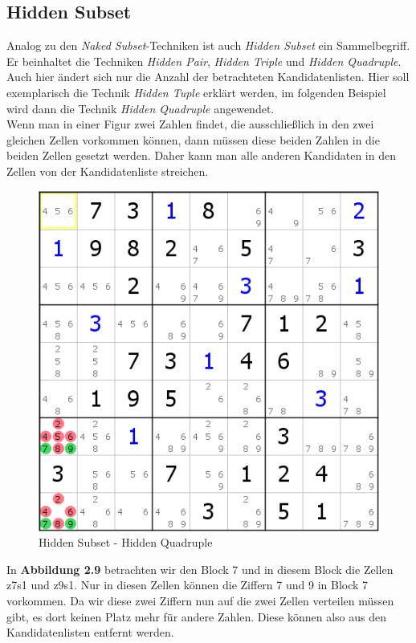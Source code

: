 \newpage
\subsection{Hidden Subset}
\label{Hidden Subset}
Analog zu den \textit{Naked Subset}-Techniken ist auch \textit{Hidden Subset} ein Sammelbegriff. Er beinhaltet die Techniken \textit{Hidden Pair}, \textit{Hidden Triple} und \textit{Hidden Quadruple}. Auch hier ändert sich nur die Anzahl der betrachteten Kandidatenlisten. Hier soll exemplarisch die Technik \textit{Hidden Tuple} erklärt werden, im folgenden Beispiel wird dann die Technik \textit{Hidden Quadruple} angewendet.\\
Wenn man in einer Figur zwei Zahlen findet, die ausschließlich in den zwei gleichen Zellen vorkommen können, dann müssen diese beiden Zahlen in die beiden Zellen gesetzt werden. Daher kann man alle anderen Kandidaten in den Zellen von der Kandidatenliste streichen.

\begin{figure}[h]
\begin{center}
\includegraphics{./img/hidden_subset.png}
\caption{Hidden Subset - Hidden Quadruple}
\end{center}
\end{figure}

In \textbf{Abbildung 2.9} betrachten wir den Block 7 und in diesem Block die Zellen z7s1 und z9s1. Nur in diesen Zellen können die Ziffern 7 und 9 in Block 7 vorkommen. Da wir diese zwei Ziffern nun auf die zwei Zellen verteilen müssen gibt, es dort keinen Platz mehr für andere Zahlen. Diese können also aus den Kandidatenlisten entfernt werden.
